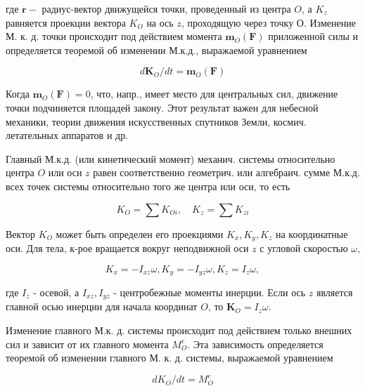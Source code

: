 \documentclass[10pt]{article}
\begin{document}
где $\boldsymbol{r}-$ радиус-вектор движущейся точки, проведенный из центра $O$, а $K_{z}$ равняется проекции вектора $K_{O}$ на ось $z$, проходящую через точку $О$. Изменение М. к. д. точки происходит под действием момента $\boldsymbol{m}_{O}(\boldsymbol{F})$ приложенной силы и определяется теоремой об изменении М.к.д., выражаемой уравнением



\[

d \boldsymbol{K}_{O} / d t=\boldsymbol{m}_{O}(\boldsymbol{F})

\]



Когда $\boldsymbol{m}_{O}(\boldsymbol{F})=0$, что, напр., имеет место для центральных сил, движение точки подчиняется площадей закону. Этот результат важен для небесной механики, теории движения искусственных спутников Земли, космич. летательных аппаратов и др.



Главный М.к.д. (или кинетический момент) механич. системы относительно центра $O$ или оси $z$ равен соответственно геометрич. или алгебраич. сумме М.к.д. всех точек системы относительно того же центра или оси, то есть



\[

K_{O}=\sum K_{O i}, \quad K_{z}=\sum K_{z i}

\]



Вектор $K_{O}$ может быть определен его проекциями $K_{x}, K_{y}, K_{z}$ на координатные оси. Для тела, к-рое вращается вокруг неподвижной оси $z$ с угловой скоростью $\omega$,



\[

K_{x}=-I_{x z} \omega, K_{y}=-I_{y z} \omega, K_{z}=I_{z} \omega,

\]



где $I_{z}$ - осевой, а $I_{x z}, I_{y z}$ - центробежные моменты инерции. Если ось $z$ является главной осью инерции для начала координат $O$, то $\boldsymbol{K}_{O}=I_{z} \omega$.



Изменение главного М.к. д. системы происходит под действием только внешних сил и зависит от их главного момента $M_{O}^{e}$. Эта зависимость определяется теоремой об изменении главного М. к. д. системы, выражаемой уравнением



\[

d K_{O} / d t=M_{O}^{e}

\]
\end{document}
